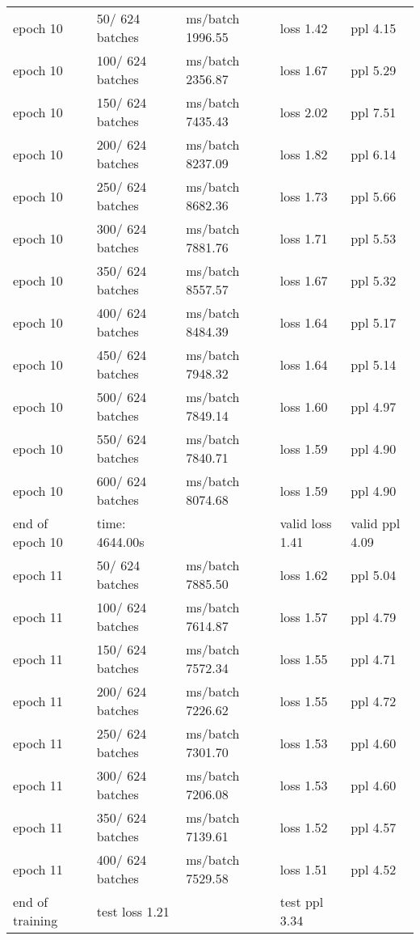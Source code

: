 \begin{center}
\begin{tabular}{ | m{3cm} | m{3cm}| m{4cm} | m{3cm} | m{3cm} | } 
\hline
\\ 
\hline
epoch  10 &    50/  624 batches & ms/batch 1996.55 & loss  1.42 & ppl     4.15\\ 
\hline
epoch  10 &   100/  624 batches & ms/batch 2356.87 & loss  1.67 & ppl     5.29\\ 
\hline
epoch  10 &   150/  624 batches & ms/batch 7435.43 & loss  2.02 & ppl     7.51\\ 
\hline
epoch  10 &   200/  624 batches & ms/batch 8237.09 & loss  1.82 & ppl     6.14\\ 
\hline
epoch  10 &   250/  624 batches & ms/batch 8682.36 & loss  1.73 & ppl     5.66\\ 
\hline
epoch  10 &   300/  624 batches & ms/batch 7881.76 & loss  1.71 & ppl     5.53\\ 
\hline
epoch  10 &   350/  624 batches & ms/batch 8557.57 & loss  1.67 & ppl     5.32\\ 
\hline
epoch  10 &   400/  624 batches & ms/batch 8484.39 & loss  1.64 & ppl     5.17\\ 
\hline
epoch  10 &   450/  624 batches & ms/batch 7948.32 & loss  1.64 & ppl     5.14\\ 
\hline
epoch  10 &   500/  624 batches & ms/batch 7849.14 & loss  1.60 & ppl     4.97\\ 
\hline
epoch  10 &   550/  624 batches & ms/batch 7840.71 & loss  1.59 & ppl     4.90\\ 
\hline
epoch  10 &   600/  624 batches & ms/batch 8074.68 & loss  1.59 & ppl     4.90\\ 
\hline

end of epoch  10 & time: 4644.00s& & valid loss  1.41 & valid ppl     4.09
\\ 
\hline
epoch  11 &    50/  624 batches & ms/batch 7885.50 & loss  1.62 & ppl     5.04\\ 
\hline
epoch  11 &   100/  624 batches & ms/batch 7614.87 & loss  1.57 & ppl     4.79\\ 
\hline
epoch  11 &   150/  624 batches & ms/batch 7572.34 & loss  1.55 & ppl     4.71\\ 
\hline
epoch  11 &   200/  624 batches & ms/batch 7226.62 & loss  1.55 & ppl     4.72\\ 
\hline
epoch  11 &   250/  624 batches & ms/batch 7301.70 & loss  1.53 & ppl     4.60\\ 
\hline
epoch  11 &   300/  624 batches & ms/batch 7206.08 & loss  1.53 & ppl     4.60\\ 
\hline
epoch  11 &   350/  624 batches & ms/batch 7139.61 & loss  1.52 & ppl     4.57\\ 
\hline
epoch  11 &   400/  624 batches & ms/batch 7529.58 & loss  1.51 & ppl     4.52\\ 
\hline
end of training & test loss  1.21& & test ppl     3.34
\\ 
\hline
\end{tabular}
\end{center}





